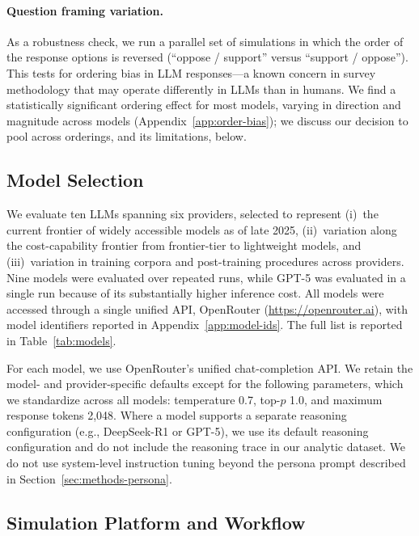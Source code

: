 \documentclass[12pt]{article}
\begin{document}
\paragraph{Question framing variation.} As a robustness check, we run a parallel set of simulations in which the order of the response options is reversed (``oppose / support'' versus ``support / oppose''). This tests for ordering bias in LLM responses---a known concern in survey methodology that may operate differently in LLMs than in humans. We find a statistically significant ordering effect for most models, varying in direction and magnitude across models (Appendix~\ref{app:order-bias}); we discuss our decision to pool across orderings, and its limitations, below.

\subsection{Model Selection}\label{sec:methods-models}

We evaluate ten LLMs spanning six providers, selected to represent
(i)~the current frontier of widely accessible models as of late 2025,
(ii)~variation along the cost-capability frontier from frontier-tier to
lightweight models, and (iii)~variation in training corpora and
post-training procedures across providers. Nine models were evaluated
over repeated runs, while GPT-5 was evaluated in a single run because
of its substantially higher inference cost. All models were accessed
through a single unified API, OpenRouter
(\url{https://openrouter.ai}), with model identifiers reported in
Appendix~\ref{app:model-ids}. The full list is reported in
Table~\ref{tab:models}.



For each model, we use OpenRouter's unified chat-completion API. We retain
the model- and provider-specific defaults except for the following
parameters, which we standardize across all models: temperature 0.7,
top-$p$ 1.0, and maximum response tokens 2{,}048. Where a model supports
a separate reasoning configuration (e.g., DeepSeek-R1 or GPT-5), we use
its default reasoning configuration and do not include the reasoning trace
in our analytic dataset. We do not use system-level instruction tuning
beyond the persona prompt described in
Section~\ref{sec:methods-persona}.

\subsection{Simulation Platform and Workflow}\label{sec:methods-platform}
\end{document}
